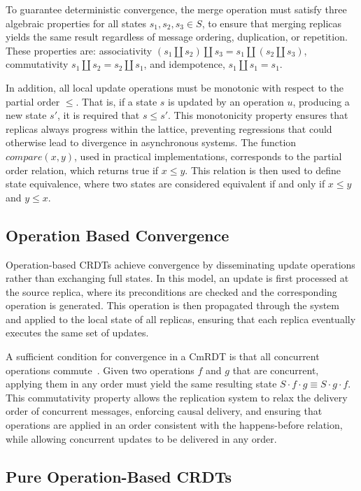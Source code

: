 To guarantee deterministic convergence, the merge operation must satisfy three algebraic properties for all states $s_1, s_2, s_3 \in S$, to ensure that merging replicas yields the same result regardless of message ordering, duplication, or repetition. These properties are: associativity $(s_1 \amalg s_2) \amalg s_3 = s_1 \amalg (s_2 \amalg s_3)$, commutativity $s_1 \amalg s_2 = s_2 \amalg s_1$, and idempotence, $s_1 \amalg s_1 = s_1$.

In addition, all local update operations must be monotonic with respect to the partial order $\leq$. That is, if a state $s$ is updated by an operation $u$, producing a new state $s'$, it is required that $s \leq s'$. This monotonicity property ensures that replicas always progress within the lattice, preventing regressions that could otherwise lead to divergence in asynchronous systems. The function $compare(x, y)$, used in practical implementations, corresponds to the partial order relation, which returns true if $x \leq y$. This relation is then used to define state equivalence, where two states are considered equivalent if and only if $x \leq y$ and $y \leq x$.

\subsection{Operation Based Convergence}
\label{sub:operation_convergence}

Operation-based CRDTs achieve convergence by disseminating update operations rather than exchanging full states. In this model, an update is first processed at the source replica, where its preconditions are checked and the corresponding operation is generated. This operation is then propagated through the system and applied to the local state of all replicas, ensuring that each replica eventually executes the same set of updates.

A sufficient condition for convergence in a CmRDT is that all concurrent operations commute~\cite{shapiro2011comprehensive}. Given two operations $f$ and $g$ that are concurrent, applying them in any order must yield the same resulting state $S \cdot f \cdot g \equiv S \cdot g \cdot f$. This commutativity property allows the replication system to relax the delivery order of concurrent messages, enforcing causal delivery, and ensuring that operations are applied in an order consistent with the happens-before relation, while allowing concurrent updates to be delivered in any order.

\subsection{Pure Operation-Based CRDTs}
\label{sub:pure_operation}

